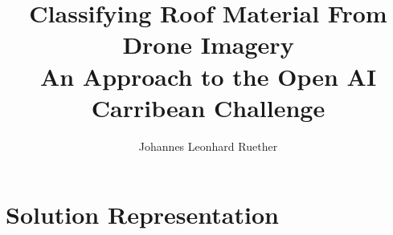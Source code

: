 \documentclass[11pt]{article}
\title{\bf{Classifying Roof Material From Drone Imagery} \\
 An Approach to the Open AI Carribean Challenge}
\author{Johannes Leonhard Ruether}
\begin{document}
	\maketitle
	
	\section{Solution Representation}
	
\end{document}
